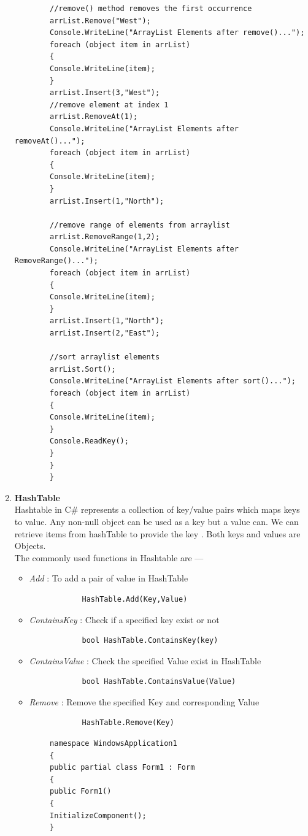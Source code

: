 \documentclass[11pt,dvipsnames,cmyk]{article}
\begin{document}
\begin{enumerate}
\begin{verbatim}
 		//remove() method removes the first occurrence
 		arrList.Remove("West");
 		Console.WriteLine("ArrayList Elements after remove()...");
 		foreach (object item in arrList)
 		{
 		Console.WriteLine(item);
 		}
 		arrList.Insert(3,"West");
 		//remove element at index 1
 		arrList.RemoveAt(1);
 		Console.WriteLine("ArrayList Elements after removeAt()...");
 		foreach (object item in arrList)
 		{
 		Console.WriteLine(item);
 		}
 		arrList.Insert(1,"North");
 		
 		//remove range of elements from arraylist
 		arrList.RemoveRange(1,2);
 		Console.WriteLine("ArrayList Elements after RemoveRange()...");
 		foreach (object item in arrList)
 		{
 		Console.WriteLine(item);
 		}
 		arrList.Insert(1,"North");
 		arrList.Insert(2,"East");
 		
 		//sort arraylist elements
 		arrList.Sort();
 		Console.WriteLine("ArrayList Elements after sort()...");
 		foreach (object item in arrList)
 		{
 		Console.WriteLine(item);
 		}
 		Console.ReadKey();
 		}
 		}
 		}
 		\end{verbatim}
 		\item\textbf{HashTable}
 		\\Hashtable in C\# represents a collection of key/value pairs which maps keys to value. Any non-null object can be used as a key but a value can. We can retrieve items from hashTable to provide the key . Both keys and values are Objects.
 		\\The commonly used functions in Hashtable are ---
 		\begin{itemize}
 			\item \emph{Add} : To add a pair of value in HashTable
 			\begin{verbatim}
 			HashTable.Add(Key,Value)
 			\end{verbatim}
 			\item \emph{ContainsKey} : Check if a specified key exist or not
 			\begin{verbatim}
 			bool HashTable.ContainsKey(key)
 			\end{verbatim}
 			\item \emph{ContainsValue} : Check the specified Value exist in HashTable
 			\begin{verbatim}
 			bool HashTable.ContainsValue(Value)
 			\end{verbatim}
 			\item \emph{Remove} : Remove the specified Key and corresponding Value
 			\begin{verbatim}
 			HashTable.Remove(Key)
 			\end{verbatim}
 		\end{itemize}
		\begin{verbatim}
		namespace WindowsApplication1
		{
		public partial class Form1 : Form
		{
		public Form1()
		{
		InitializeComponent();
		}
		

\end{verbatim}
\end{enumerate}
\end{document}
